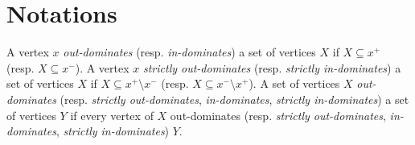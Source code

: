 \section{Notations}


A vertex $x$ {\em out-dominates} (resp. {\em in-dominates}) a set of vertices $X$ if $X\subseteq x^+$ (resp. $X\subseteq x^-$). A vertex $x$ {\em strictly out-dominates} (resp. {\em strictly in-dominates}) a set of vertices $X$ if $X \subseteq x^+\setminus x^-$ (resp. $X \subseteq x^- \setminus x^+$). A set of vertices $X$ {\em out-dominates} (resp. {\em strictly out-dominates}, {\em in-dominates}, {\em strictly in-dominates}) a set of vertices $Y$ if every vertex of $X$ out-dominates (resp. {\em strictly out-dominates}, {\em in-dominates}, {\em strictly in-dominates}) $Y$.




